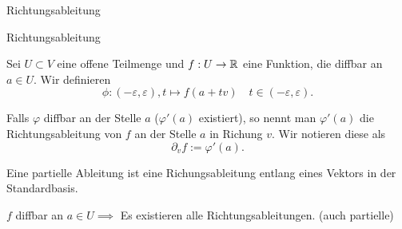 \documentclass[class=article, crop=false]{standalone}
\begin{document}
\begin{zettel}{Richtungsableitung}
\begin{flashcard}[q8g35oi6]{Richtungsableitung}
	\begin{definition}
		Sei $U \subset V$ eine offene Teilmenge und $f: U \to \mathbb{R} $ eine Funktion, die diffbar an $a \in   U$. Wir definieren
		\[
			\phi : (-\varepsilon,\varepsilon), t \mapsto f (a+ tv) \quad t \in  (-\varepsilon,\varepsilon)
		.\]

		Falls $\varphi$ diffbar an der Stelle $a$ ($\varphi'(a)$ existiert), so nennt man $\varphi '(a)$ die Richtungsableitung von $f$ an der Stelle $a$ in Richung $v$. Wir notieren diese als
		\[
			\partial_v f := \varphi ' (a)
		.\]
	\end{definition}
\end{flashcard}

\begin{remark}
	Eine partielle Ableitung ist eine Richungsableitung entlang eines Vektors in der Standardbasis.
\end{remark}

\begin{theorem}
	$f$ diffbar an $a \in  U \implies $ Es existieren alle Richtungsableitungen. (auch partielle)
\end{theorem}

\end{zettel}
\end{document}
